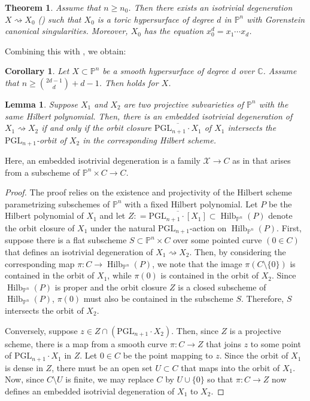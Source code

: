 \documentclass[11pt,reqno]{amsart}
\newcommand{\C}{\mathbb{C}}
\renewcommand{\P}{\mathbb{P}}
\newcommand{\cX}{\mathcal{X}}
\newcommand{\bP}{\mathbb{P}}
\newcommand{\PP}{\mathbb{P}}
\DeclareMathOperator{\Hilb}{Hilb}
\newcommand{\PGL}{\mathrm{PGL}}
\numberwithin{equation}{section}
\newtheorem{thm}[prop] {Theorem}
\newtheorem{lem}[prop] {Lemma}
\newtheorem{cor}[prop]{Corollary}
\theoremstyle{definition}
\begin{document}
\begin{thm} \label{thmlowdegree}
Assume that $n\geq n_0$. Then there exists an isotrivial degeneration $X\rightsquigarrow X_0$ () such that $X_0$ is a toric hypersurface of degree $d$ in $\bP^n$ with Gorenstein canonical singularities. Moreover, $X_0$ has the equation $x_0^d= x_1\cdots x_d$.
\end{thm}

Combining this with , we obtain:

\begin{cor} \label{cor:hypersurface}
Let $X \subset \P^n$ be a smooth hypersurface of degree $d$ over $\C$. Assume that $n \geq \binom{2d -1}{d} +d-1 $. Then  holds for $X$.    
\end{cor}

\begin{lem} \label{lem:embeddedisotriv}
    Suppose $X_1 $ and $X_2$ are two projective subvarieties of $\P^n$ with the same Hilbert polynomial. Then, there is an \emph{embedded} isotrivial degeneration of $X_1 \rightsquigarrow X_2$ if and only if the orbit closure $\overline{\PGL_{n+1} \cdot X_1}$ of $X_1$ intersects the $\PGL_{n+1}$-orbit of $X_2$ in the corresponding Hilbert scheme.
\end{lem}
Here, an embedded isotrivial degeneration is a family $\cX \to C$ as in  that arises from a subscheme of $\PP^n \times C \to C$.
\begin{proof}
    The proof relies on the existence and projectivity of the Hilbert scheme parametrizing subschemes of $\PP^n$ with a fixed Hilbert polynomial. Let $P$ be the Hilbert polynomial of $X_1$ and let $Z : = \overline{\PGL_{n+1} \cdot [X_1]} \subset \Hilb_{\P^n} (P)$ denote the orbit closure of $X_1$ under the natural $\PGL_{n+1}$-action on $\Hilb_{\P^n} (P)$. First, suppose there is a flat subscheme $S \subset \P^n \times C $ over some pointed curve $(0 \in C)$ that defines an isotrivial degeneration of $X_1 \rightsquigarrow X_2$. Then, by considering the corresponding map $ \pi: C \to \Hilb_{\P^n} (P)$, we note that the image $\pi (C \setminus \{0\})$ is contained in the orbit of $X_1$, while $\pi(0) $ is contained in the orbit of $X_2$. Since $\Hilb_{\P^n}(P)$ is proper and the orbit closure $Z$ is a closed subscheme of $\Hilb_{\P^n}(P)$, $\pi(0)$ must also be contained in the subscheme $S$. Therefore, $S$ intersects the orbit of $X_2$.

    Conversely, suppose $z \in Z \cap (\PGL_{n+1} \cdot X_2)$. Then, since $Z$ is a projective scheme, there is a map from a smooth curve $\pi: C \to Z$ that joins $z$ to some point of $\PGL_{n+1} \cdot X_1$ in $Z$. Let $0  \in C$ be the point mapping to $z$. Since the orbit of $X_1$ is dense in $Z$, there must be an open set $U \subset C$ that maps into the orbit of $X_1$. Now, since $C \setminus U$ is finite, we may replace $C$ by $U \cup \{0\}$ so that $\pi: C \to Z$ now defines an embedded isotrivial degeneration of $X_1$ to $X_2$.
\end{proof}
\end{document}
